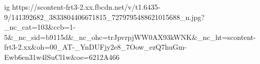  
 
 
 
 

\ifcmt
  ig https://scontent-frt3-2.xx.fbcdn.net/v/t1.6435-9/141392682_3833804406671815_7279795488621015688_n.jpg?_nc_cat=103&ccb=1-5&_nc_sid=b9115d&_nc_ohc=trJpvrpjWW0AX93kWNK&_nc_ht=scontent-frt3-2.xx&oh=00_AT-_YnDUFjy2e8_7Oow_ezQ7huGm-Ewb6en31w4lSuCl1w&oe=6212A466
\fi
